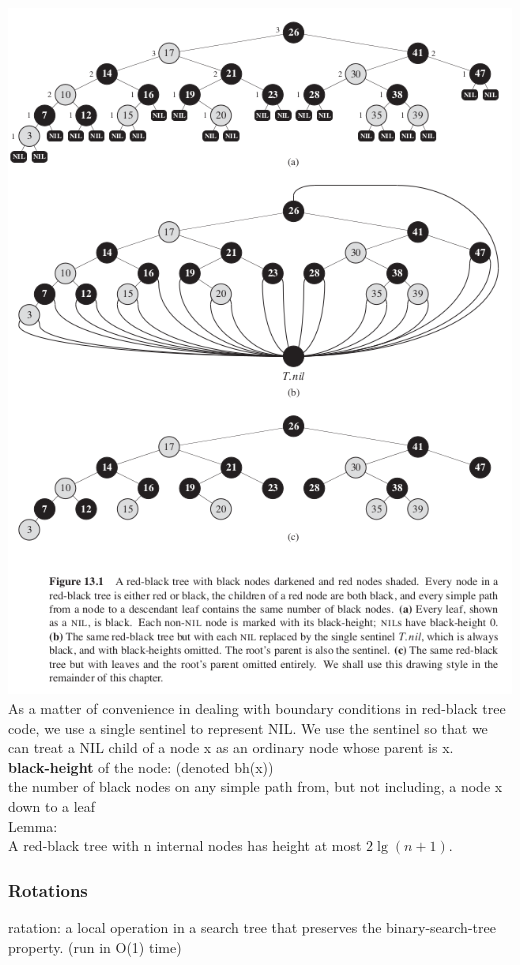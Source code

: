 \documentclass[11pt]{article}
\begin{document}
\includegraphics[width=.9\linewidth]{pics/c13_red_black_tree_fig.png} \\


As a matter of convenience in dealing with boundary conditions in red-black tree code, we use a single sentinel to represent NIL. We use the sentinel so that we can treat a NIL child of a node x as an ordinary node whose parent is x. \\

\textbf{black-height} of the node: (denoted bh(x)) \\
the number of black nodes on any simple path from, but not including, a node x down to a leaf \\



Lemma: \\
A red-black tree with n internal nodes has height at most $2\lg(n+1)$. \\

\subsubsection{Rotations}
\label{sec-4-4-2}
ratation: a local operation in a search tree that preserves the binary-search-tree property. (run in O(1) time) \\
\end{document}
